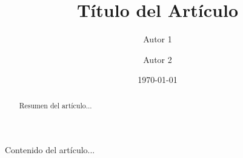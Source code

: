 \documentclass{article}
\title{Título del Artículo}
\author[1]{Autor 1}
\author[2]{Autor 2}
\affil[1]{Afiliación del Autor 1}
\affil[2]{Afiliación del Autor 2}
\date{\today}
\begin{document}
\maketitle
\begin{abstract}
Resumen del artículo...
\end{abstract}
Contenido del artículo...
\end{document}
